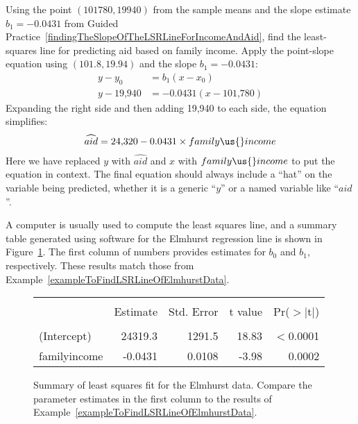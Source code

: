 \begin{examplewrap}
\begin{nexample}{Using the point $(101780, 19940)$
    from the sample means and the slope estimate
    $b_1 = -0.0431$ from Guided
    Practice~\ref{findingTheSlopeOfTheLSRLineForIncomeAndAid},
    find the least-squares line for predicting aid based
    on family income.}
  \label{exampleToFindLSRLineOfElmhurstData}%
  Apply the point-slope equation using $(101.8, 19.94)$
  and the slope $b_1 = -0.0431$:
  \begin{align*}
  y - y_0    &= b_1 (x - x_0) \\
  y - \text{19,940}  &= -0.0431(x - \text{101,780})
  \end{align*}
  Expanding the right side and then adding 19,940 to each side,
  the equation simplifies:
  \begin{align*}
  \widehat{aid} = \text{24,320} - 0.0431 \times family\us{}income
  \end{align*}
  Here we have replaced $y$ with $\widehat{aid}$ and $x$ with
  $family\us{}income$ to put the equation in context.
  The final equation should always include a ``hat''
  on the variable being predicted, whether it is a generic
  ``$y$'' or a named variable like ``$aid$''.
\end{nexample}
\end{examplewrap}

A computer is usually used to compute the least squares line,
and a summary table generated using software for the Elmhurst
regression line is shown in
Figure~\ref{rOutputForIncomeAidLSRLine}.
The first column of numbers provides estimates for ${b}_0$
and ${b}_1$, respectively.
These results match those from
Example~\ref{exampleToFindLSRLineOfElmhurstData}.

\begin{figure}[ht]
\centering
\begin{tabular}{l rrrr}
  \hline
  \vspace{-3.7mm} & & & & \\
 & Estimate & Std. Error & t value & Pr($>$$|$t$|$) \\ 
  \hline
  \vspace{-3.6mm} & & & & \\
(Intercept) & 24319.3 & 1291.5 & 18.83 & $<$0.0001 \\ 
family\us{}income & -0.0431 & 0.0108 & -3.98 & 0.0002 \\ 
  \hline
\end{tabular}
\caption{Summary of least squares fit for the Elmhurst data.
    Compare the parameter estimates in the first column to
    the results of
    Example~\ref{exampleToFindLSRLineOfElmhurstData}.}
\label{rOutputForIncomeAidLSRLine}
\end{figure}

